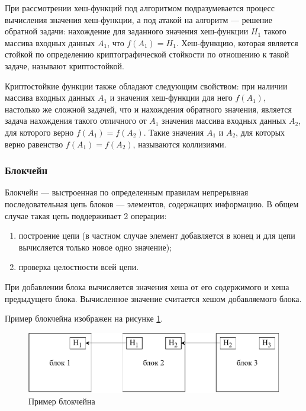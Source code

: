 При рассмотрении хеш-функций под алгоритмом подразумевается процесс вычисления значения хеш-функции, а под атакой на алгоритм --- решение обратной задачи: нахождение для заданного значения хеш-функции $H_1$ такого массива входных данных $A_1$, что $f(A_1) = H_1$. Хеш-функцию, которая является стойкой по определению криптографической стойкости по отношению к такой задаче, называют криптостойкой.

Криптостойкие функции также обладают следующим свойством: при наличии массива входных данных $A_1$ и значения хеш-функции для него $f(A_1)$, настолько же сложной задачей, что и нахождения обратного значения, является задача нахождения такого отличного от $A_1$ значения массива входных данных $A_2$, для которого верно $f(A_1) = f(A_2)$. Такие значения $A_1$ и $A_2$, для которых верно равенство $f(A_1) = f(A_2)$, называются коллизиями.

\subsubsection{Блокчейн}

Блокчейн --- выстроенная по определенным правилам непрерывная последовательная цепь блоков --- элементов, содержащих информацию. \cite{bitcoin} В общем случае такая цепь поддерживает 2 операции:
\begin{enumerate}
    \item построение цепи (в частном случае элемент добавляется в конец и для цепи вычисляется только новое одно значение);
	\item проверка целостности всей цепи.
\end{enumerate}

При добавлении блока вычисляется значения хеша от его содержимого и хеша предыдущего блока. Вычисленное значение считается хешом добавляемого блока.

Пример блокчейна изображен на рисунке \ref{fig:blockchain}.

\begin{figure}[hbtp]
	\centering
	\includegraphics[width=\textwidth]{img/blockchain.pdf}
	\caption{Пример блокчейна}
	\label{fig:blockchain}
\end{figure}

